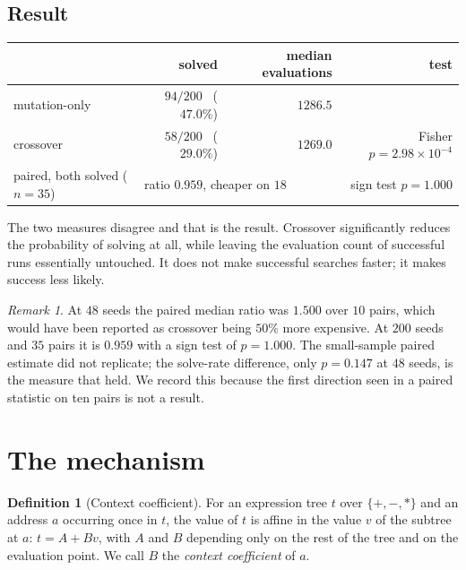 \documentclass[11pt,a4paper]{article}
\theoremstyle{definition}
\newtheorem{definition}[theorem]{Definition}
\theoremstyle{remark}
\newtheorem{remark}{Remark}[section]
\begin{document}
\subsection{Result}

\begin{center}
\begin{tabular}{lrrr}
\toprule
 & solved & median evaluations & test \\
\midrule
mutation-only & $94/200$ \ ($47.0\%$) & $1286.5$ & \\
crossover     & $58/200$ \ ($29.0\%$) & $1269.0$ & Fisher $p = 2.98\times10^{-4}$ \\
\midrule
paired, both solved ($n=35$) & \multicolumn{2}{l}{ratio $0.959$, cheaper on $18$} & sign test $p = 1.000$ \\
\bottomrule
\end{tabular}
\end{center}

The two measures disagree and that is the result. Crossover significantly
reduces the probability of solving at all, while leaving the evaluation count of
successful runs essentially untouched. It does not make successful searches
faster; it makes success less likely.

\begin{remark}
At $48$ seeds the paired median ratio was $1.500$ over $10$ pairs, which would
have been reported as crossover being $50\%$ more expensive. At $200$ seeds and
$35$ pairs it is $0.959$ with a sign test of $p=1.000$. The small-sample paired
estimate did not replicate; the solve-rate difference, only $p = 0.147$ at $48$
seeds, is the measure that held. We record this because the first direction seen
in a paired statistic on ten pairs is not a result.
\end{remark}

\section{The mechanism}\label{sec:mechanism}

\begin{definition}[Context coefficient]
For an expression tree $t$ over $\{+,-,*\}$ and an address $a$ occurring once in
$t$, the value of $t$ is affine in the value $v$ of the subtree at $a$:
$t = A + Bv$, with $A$ and $B$ depending only on the rest of the tree and on the
evaluation point. We call $B$ the \emph{context coefficient} of $a$.
\end{definition}
\end{document}
